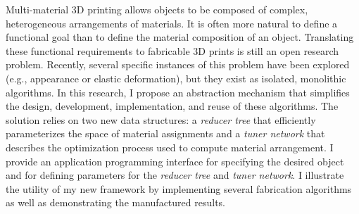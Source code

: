 Multi-material 3D printing allows objects to be composed of complex, heterogeneous arrangements of materials.
It is often more natural to define a functional goal than to define the material composition of an object.
Translating these functional requirements to fabricable 3D prints is still an open research problem.
Recently, several specific instances of this problem have been explored
(e.g.,  appearance or elastic deformation),
but they exist as isolated, monolithic algorithms.
In this research, I propose an abstraction mechanism that simplifies the design, development, implementation, and reuse of these algorithms.
The solution relies on two new data structures:
a \emph{reducer tree} that efficiently parameterizes the space of material assignments
and a \emph{tuner network} that describes the optimization process used to compute material arrangement.
I provide an application programming interface for specifying the desired object and for defining parameters
for the \emph{reducer tree} and \emph{tuner network}. I illustrate the utility of my new framework
by implementing several fabrication algorithms as well as demonstrating the manufactured results.
